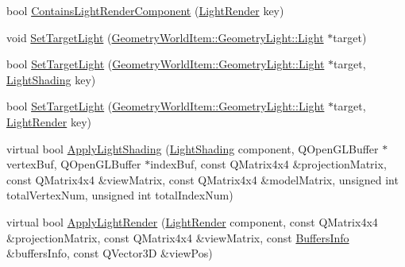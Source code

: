 \begin{DoxyCompactItemize}
\item 
bool \mbox{\hyperlink{class_geometry_engine_1_1_light_utils_1_1_light_component_manager_a938dfaba1159f85fbfcae097a867644a}{Contains\+Light\+Render\+Component}} (\mbox{\hyperlink{namespace_geometry_engine_1_1_light_utils_ac3078de660742daceaa06bd9bc61d24a}{Light\+Render}} key)
\item 
void \mbox{\hyperlink{class_geometry_engine_1_1_light_utils_1_1_light_component_manager_a58bdb7761c9adde821fda19062ef0ae5}{Set\+Target\+Light}} (\mbox{\hyperlink{class_geometry_engine_1_1_geometry_world_item_1_1_geometry_light_1_1_light}{Geometry\+World\+Item\+::\+Geometry\+Light\+::\+Light}} $\ast$target)
\item 
bool \mbox{\hyperlink{class_geometry_engine_1_1_light_utils_1_1_light_component_manager_ad502d8781fa4d993d4db5b6954b14ff6}{Set\+Target\+Light}} (\mbox{\hyperlink{class_geometry_engine_1_1_geometry_world_item_1_1_geometry_light_1_1_light}{Geometry\+World\+Item\+::\+Geometry\+Light\+::\+Light}} $\ast$target, \mbox{\hyperlink{namespace_geometry_engine_1_1_light_utils_a16eb370137c2fd151e6f8e1d07cd23e0}{Light\+Shading}} key)
\item 
bool \mbox{\hyperlink{class_geometry_engine_1_1_light_utils_1_1_light_component_manager_a617a2cf91b3e0280a2f88cb91ce0fb04}{Set\+Target\+Light}} (\mbox{\hyperlink{class_geometry_engine_1_1_geometry_world_item_1_1_geometry_light_1_1_light}{Geometry\+World\+Item\+::\+Geometry\+Light\+::\+Light}} $\ast$target, \mbox{\hyperlink{namespace_geometry_engine_1_1_light_utils_ac3078de660742daceaa06bd9bc61d24a}{Light\+Render}} key)
\item 
virtual bool \mbox{\hyperlink{class_geometry_engine_1_1_light_utils_1_1_light_component_manager_aea6e9aa3b5b26039fdaab99dc4e1af14}{Apply\+Light\+Shading}} (\mbox{\hyperlink{namespace_geometry_engine_1_1_light_utils_a16eb370137c2fd151e6f8e1d07cd23e0}{Light\+Shading}} component, Q\+Open\+G\+L\+Buffer $\ast$vertex\+Buf, Q\+Open\+G\+L\+Buffer $\ast$index\+Buf, const Q\+Matrix4x4 \&projection\+Matrix, const Q\+Matrix4x4 \&view\+Matrix, const Q\+Matrix4x4 \&model\+Matrix, unsigned int total\+Vertex\+Num, unsigned int total\+Index\+Num)
\item 
virtual bool \mbox{\hyperlink{class_geometry_engine_1_1_light_utils_1_1_light_component_manager_a21423f7a50b0a6c53370665d134e0d0d}{Apply\+Light\+Render}} (\mbox{\hyperlink{namespace_geometry_engine_1_1_light_utils_ac3078de660742daceaa06bd9bc61d24a}{Light\+Render}} component, const Q\+Matrix4x4 \&projection\+Matrix, const Q\+Matrix4x4 \&view\+Matrix, const \mbox{\hyperlink{class_geometry_engine_1_1_buffers_info}{Buffers\+Info}} \&buffers\+Info, const Q\+Vector3D \&view\+Pos)

\end{DoxyCompactItemize}
